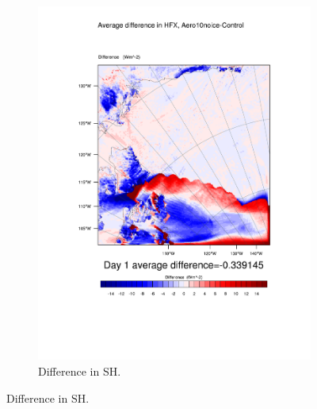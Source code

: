 \begin{figure}
\begin{subfigure}{0.48\textwidth}
		\includegraphics[width=\textwidth]{results/aero10ni/diff_Aero10NoIce_HFX_Day1.pdf}
		\caption{Difference in SH.}
		\label{subfig:sh_r4Day1}
	\end{subfigure}


\end{figure}
